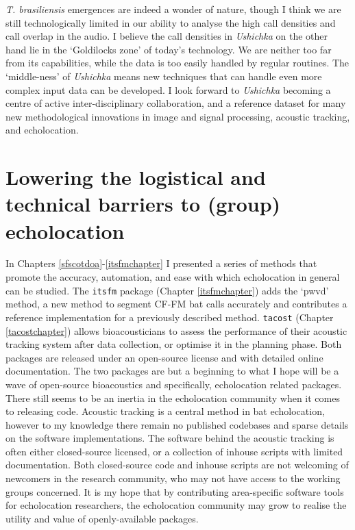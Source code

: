 \documentclass[
]{book}
\begin{document}
\emph{T. brasiliensis} emergences are indeed a wonder of nature, though I think we are still technologically limited in our ability to analyse the high call densities and call overlap in the audio. I believe the call densities in \emph{Ushichka} on the other hand lie in the `Goldilocks zone' of today's technology. We are neither too far from its capabilities, while the data is too easily handled by regular routines. The `middle-ness' of \emph{Ushichka} means new techniques that can handle even more complex input data can be developed. I look forward to \emph{Ushichka} becoming a centre of active inter-disciplinary collaboration, and a reference dataset for many new methodological innovations in image and signal processing, acoustic tracking, and echolocation.

\hypertarget{lowering-the-logistical-and-technical-barriers-to-group-echolocation}{%
\section{Lowering the logistical and technical barriers to (group) echolocation}\label{lowering-the-logistical-and-technical-barriers-to-group-echolocation}}

In Chapters \ref{sfscotdoa}-\ref{itsfmchapter} I presented a series of methods that promote the accuracy, automation, and ease with which echolocation in general can be studied. The \texttt{itsfm} package (Chapter \ref{itsfmchapter}) adds the `pwvd' method, a new method to segment CF-FM bat calls accurately and contributes a reference implementation for a previously described method. \texttt{tacost} (Chapter \ref{tacostchapter}) allows bioacousticians to assess the performance of their acoustic tracking system after data collection, or optimise it in the planning phase. Both packages are released under an open-source license and with detailed online documentation. The two packages are but a beginning to what I hope will be a wave of open-source bioacoustics and specifically, echolocation related packages. There still seems to be an inertia in the echolocation community when it comes to releasing code. Acoustic tracking is a central method in bat echolocation, however to my knowledge there remain no published codebases and sparse details on the software implementations. The software behind the acoustic tracking is often either closed-source licensed, or a collection of inhouse scripts with limited documentation. Both closed-source code and inhouse scripts are not welcoming of newcomers in the research community, who may not have access to the working groups concerned. It is my hope that by contributing area-specific software tools for echolocation researchers, the echolocation community may grow to realise the utility and value of openly-available packages.
\end{document}

